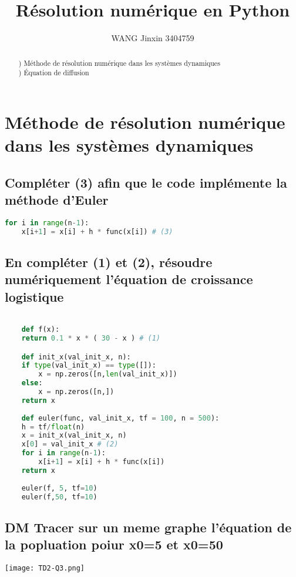 \documentclass[a4paper,10pt]{article}
\title{Résolution numérique en Python}
\author{WANG Jinxin 3404759}
\begin{document}
\maketitle

\begin{abstract}
) Méthode de résolution numérique dans les systèmes dynamiques\\
) Équation de diffusion\\
\end{abstract}

\newpage
\section{Méthode de résolution numérique dans les systèmes dynamiques}

\subsection{ Compléter (3) afin que le code implémente la méthode d'Euler }
\begin{lstlisting}[language=Python]
    for i in range(n-1):
	x[i+1] = x[i] + h * func(x[i]) # (3)
\end{lstlisting} 

\subsection {En compléter (1) et (2), résoudre numériquement l'équation de croissance logistique}
\begin{lstlisting}[language=Python]

    def f(x):
	return 0.1 * x * ( 30 - x ) # (1)

    def init_x(val_init_x, n):
	if type(val_init_x) == type([]):
	    x = np.zeros([n,len(val_init_x)])
	else:
	    x = np.zeros([n,])
	return x
    
    def euler(func, val_init_x, tf = 100, n = 500):
	h = tf/float(n)
	x = init_x(val_init_x, n)
	x[0] = val_init_x # (2)
	for i in range(n-1):
	    x[i+1] = x[i] + h * func(x[i])
	return x
	
    euler(f, 5, tf=10)
    euler(f,50, tf=10)   

\end{lstlisting} 
\subsection{ DM Tracer sur un meme graphe l'équation de la popluation poiur x0=5 et x0=50 }
\begin{center}
\texttt{[image: TD2-Q3.png]}
\end{center}
\end{document}
